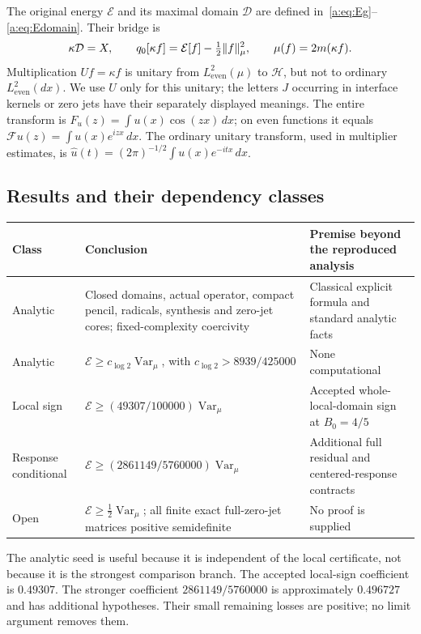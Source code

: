 \documentclass[11pt,a4paper]{article}
\numberwithin{equation}{section}
\theoremstyle{definition}\newtheorem{definition}[theorem]{Definition}
\theoremstyle{remark}\newtheorem{remark}[theorem]{Remark}
\newcommand{\E}{\mathcal E}\newcommand{\D}{\mathcal D}
\newcommand{\He}{L^2_{\mathrm{even}}(\mu)}\newcommand{\Le}{L^2_{\mathrm{even}}(dx)}
\newcommand{\Hh}{\mathcal H}\newcommand{\Hw}{\mathcal H}
\begin{document}
The original energy $\E$ and its maximal domain $\D$ are defined in~\eqref{a:eq:Eg}--\eqref{a:eq:Edomain}. Their bridge is
\begin{equation}\label{eq:intro-bridge}
 \kappa\D=X,\qquad q_0[\kappa f]=\E[f]-\tfrac12\norm f_\mu^2,
 \qquad \mu(f)=2m(\kappa f).
\end{equation}
Multiplication $Uf=\kappa f$ is unitary from $\He$ to $\Hh$, but not to ordinary $\Le$. We use $U$ only for this unitary; the letters $J$ occurring in interface kernels or zero jets have their separately displayed meanings. The entire transform is $F_u(z)=\int u(x)\cos(zx)\,dx$; on even functions it equals $\mathcal Fu(z)=\int u(x)e^{izx}\,dx$. The ordinary unitary transform, used in multiplier estimates, is $\widehat u(t)=(2\pi)^{-1/2}\int u(x)e^{-itx}\,dx$.

\subsection{Results and their dependency classes}
\begin{center}\small
\begin{tabular}{@{}p{}p{}p{}@{}}
\toprule Class & Conclusion & Premise beyond the reproduced analysis\\\midrule
Analytic & Closed domains, actual operator, compact pencil, radicals, synthesis and zero-jet cores; fixed-complexity coercivity & Classical explicit formula and standard analytic facts\\[3pt]
Analytic & $\E\ge c_{\log2}\operatorname{Var}_\mu$, with $c_{\log2}>8939/425000$ & None computational\\[3pt]
Local sign & $\E\ge(49307/100000)\operatorname{Var}_\mu$ & Accepted whole-local-domain sign at $B_0=4/5$\\[3pt]
Response conditional & $\E\ge(2861149/5760000)\operatorname{Var}_\mu$ & Additional full residual and centered-response contracts\\[3pt]
Open & $\E\ge\tfrac12\operatorname{Var}_\mu$; all finite exact full-zero-jet matrices positive semidefinite & No proof is supplied\\\bottomrule
\end{tabular}
\end{center}
The analytic seed is useful because it is independent of the local certificate, not because it is the strongest comparison branch. The accepted local-sign coefficient is $0.49307$. The stronger coefficient $2861149/5760000$ is approximately $0.496727$ and has additional hypotheses. Their small remaining losses are positive; no limit argument removes them.
\end{document}
